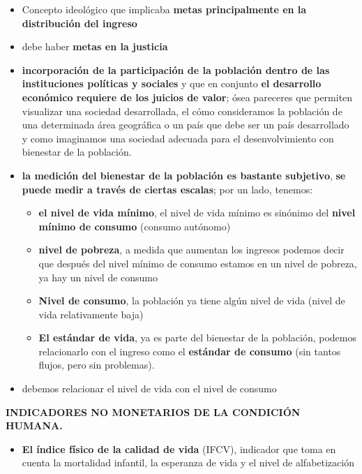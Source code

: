 \documentclass[
  a4paper,
]{article}
\providecommand{\tightlist}{%
  \setlength{\itemsep}{0pt}\setlength{\parskip}{0pt}}\usepackage{longtable,booktabs,array}
\begin{document}
\begin{itemize}
\tightlist
\item
  Concepto ideológico que implicaba \textbf{metas principalmente en la
  distribución del ingreso}
\item
  debe haber \textbf{metas en la justicia}
\item
  \textbf{incorporación de la participación de la población dentro de
  las instituciones políticas y sociales} y que en conjunto \textbf{el
  desarrollo económico requiere de los juicios de valor}; ósea pareceres
  que permiten visualizar una sociedad desarrollada, el cómo
  consideramos la población de una determinada área geográfica o un país
  que debe ser un país desarrollado y como imaginamos una sociedad
  adecuada para el desenvolvimiento con bienestar de la población.
\item
  \textbf{la medición del bienestar de la población es bastante
  subjetivo}, \textbf{se puede medir a través de ciertas escalas}; por
  un lado, tenemos:

  \begin{itemize}
  \tightlist
  \item
    \textbf{el nivel de vida mínimo}, el nivel de vida mínimo es
    sinónimo del \textbf{nivel mínimo de consumo} (consumo autónomo)
  \item
    \textbf{nivel de pobreza}, a medida que aumentan los ingresos
    podemos decir que después del nivel mínimo de consumo estamos en un
    nivel de pobreza, ya hay un nivel de consumo
  \item
    \textbf{Nivel de consumo}, la población ya tiene algún nivel de vida
    (nivel de vida relativamente baja)
  \item
    \textbf{El estándar de vida}, ya es parte del bienestar de la
    población, podemos relacionarlo con el ingreso como el
    \textbf{estándar de consumo} (sin tantos flujos, pero sin
    problemas).
  \end{itemize}
\item
  debemos relacionar el nivel de vida con el nivel de consumo
\end{itemize}

\textbf{INDICADORES NO MONETARIOS DE LA CONDICIÓN HUMANA.}

\begin{itemize}
\tightlist
\item
  \textbf{El índice físico de la calidad de vida} (IFCV), indicador que
  toma en cuenta la mortalidad infantil, la esperanza de vida y el nivel
  de alfabetización
\end{itemize}
\end{document}
